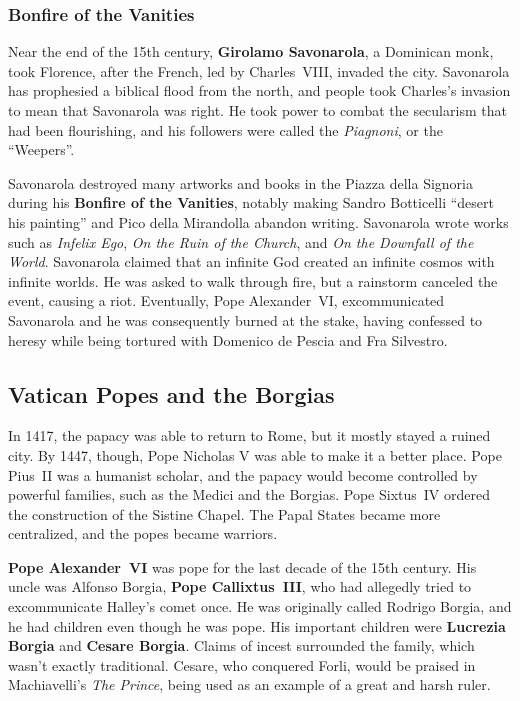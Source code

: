 \subsubsection*{Bonfire of the Vanities}

Near the end of the 15th century, \textbf{Girolamo Savonarola}, a Dominican monk, took Florence,
after the French, led by Charles~VIII, invaded the city.
Savonarola has prophesied a biblical flood from the north,
and people took Charles's invasion to mean that Savonarola was right.
He took power to combat the secularism that had been flourishing,
and his followers were called the \textit{Piagnoni}, or the ``Weepers''.

Savonarola destroyed many artworks and books in the Piazza della Signoria
during his \textbf{Bonfire of the Vanities},
notably making Sandro Botticelli ``desert his painting'' and Pico della Mirandolla abandon writing.
Savonarola wrote works such as
\textit{Infelix Ego},
\textit{On the Ruin of the Church},
and \textit{On the Downfall of the World}.
Savonarola claimed that an infinite God created an infinite cosmos with infinite worlds.
He was asked to walk through fire, but a rainstorm canceled the event, causing a riot.
Eventually, Pope Alexander~VI, excommunicated Savonarola and he was consequently burned at the stake,
having confessed to heresy while being tortured with Domenico de Pescia and Fra Silvestro.

\subsection*{Vatican Popes and the Borgias}

In 1417, the papacy was able to return to Rome, but it mostly stayed a ruined city.
By 1447, though, Pope Nicholas V was able to make it a better place.
Pope Pius~II was a humanist scholar, and the papacy would become controlled by powerful families,
such as the Medici and the Borgias.
Pope Sixtus~IV ordered the construction of the Sistine Chapel.
The Papal States became more centralized, and the popes became warriors.

\textbf{Pope Alexander~VI} was pope for the last decade of the 15th century.
His uncle was Alfonso Borgia, \textbf{Pope Callixtus~III},
who had allegedly tried to excommunicate Halley's comet once.
He was originally called Rodrigo Borgia, and he had children even though he was pope.
His important children were \textbf{Lucrezia Borgia} and \textbf{Cesare Borgia}.
Claims of incest surrounded the family, which wasn't exactly traditional.
Cesare, who conquered Forli, would be praised in Machiavelli's \textit{The Prince},
being used as an example of a great and harsh ruler.


